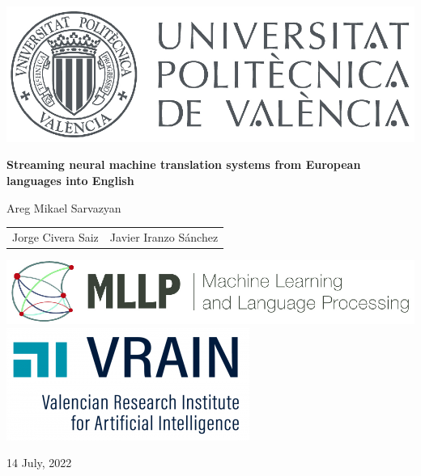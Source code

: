 \documentclass[landscape]{article}
\renewcommand{\today}{14 July, 2022}
\renewcommand{\author}{Areg Mikael Sarvazyan}
\renewcommand{\title}{Streaming neural machine translation systems from European languages into English}
\begin{document}
\cp
\thispagestyle{empty}

\begin{center}

\centerline{\includegraphics[height=0.15\textheight]{figures/UPV-logo}}

\rule{0mm}{20mm}
\Large{\Large\textbf{\color{darkred}\title}}

\rule{0mm}{30mm}
{\normalsize \color{greyblue}\author}

\rule{0mm}{0mm}
\begin{table}[ht!]
    \begin{tabularx}{\textwidth}{YY}
        \small \color{greyblue} Jorge Civera Saiz & \small \color{greyblue} Javier Iranzo Sánchez\\
    \end{tabularx}
\end{table}

\end{center}

\centerline{\includegraphics[height=0.12\textheight]{figures/MLLP_Brand} \qquad \qquad \includegraphics[height=0.15\textheight]{figures/vrain.png}}

\normalsize\small
\vspace{10mm}

\centerline{\today}
\vfill
\end{document}
